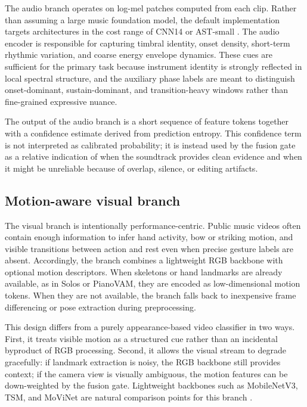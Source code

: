 The audio branch operates on log-mel patches computed from each clip. Rather than assuming a large music foundation model, the default implementation targets architectures in the cost range of CNN14 or AST-small \citep{Kong2020PANNs,Gong2021AST}. The audio encoder is responsible for capturing timbral identity, onset density, short-term rhythmic variation, and coarse energy envelope dynamics. These cues are sufficient for the primary task because instrument identity is strongly reflected in local spectral structure, and the auxiliary phase labels are meant to distinguish onset-dominant, sustain-dominant, and transition-heavy windows rather than fine-grained expressive nuance.

The output of the audio branch is a short sequence of feature tokens together with a confidence estimate derived from prediction entropy. This confidence term is not interpreted as calibrated probability; it is instead used by the fusion gate as a relative indication of when the soundtrack provides clean evidence and when it might be unreliable because of overlap, silence, or editing artifacts.

\subsection{Motion-aware visual branch}

The visual branch is intentionally performance-centric. Public music videos often contain enough information to infer hand activity, bow or striking motion, and visible transitions between action and rest even when precise gesture labels are absent. Accordingly, the branch combines a lightweight RGB backbone with optional motion descriptors. When skeletons or hand landmarks are already available, as in Solos or PianoVAM, they are encoded as low-dimensional motion tokens. When they are not available, the branch falls back to inexpensive frame differencing or pose extraction during preprocessing.

This design differs from a purely appearance-based video classifier in two ways. First, it treats visible motion as a structured cue rather than an incidental byproduct of RGB processing. Second, it allows the visual stream to degrade gracefully: if landmark extraction is noisy, the RGB backbone still provides context; if the camera view is visually ambiguous, the motion features can be down-weighted by the fusion gate. Lightweight backbones such as MobileNetV3, TSM, and MoViNet are natural comparison points for this branch \citep{Howard2019MobileNetV3,Lin2022TSM,Kondratyuk2021MoViNets}.

